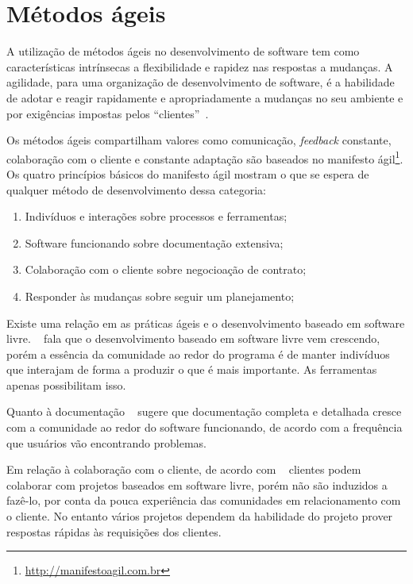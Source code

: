 
\section{Métodos ágeis}
\label{metodos-ageis}

A utilização de métodos ágeis no desenvolvimento de software tem como características 
intrínsecas a flexibilidade e rapidez nas respostas a mudanças. 
%
A agilidade, para uma organização de desenvolvimento de software, é a habilidade 
de adotar e reagir rapidamente e apropriadamente a mudanças no seu ambiente e por 
exigências impostas pelos ``clientes''~\cite{nerur2005}.
 	
Os métodos ágeis compartilham valores como comunicação, \emph{feedback} constante, colaboração com o cliente e constante adaptação são baseados no manifesto ágil\footnote{\url{http://manifestoagil.com.br}}. Os quatro princípios básicos do manifesto ágil mostram o que se espera de qualquer método de desenvolvimento dessa categoria:
%
\begin{enumerate}
\item Indivíduos  e interações sobre processos e ferramentas;
\item Software funcionando sobre documentação extensiva;
\item Colaboração com o cliente sobre negocioação de contrato;
\item Responder às  mudanças sobre seguir um planejamento;
\end{enumerate}

Existe uma relação em as práticas ágeis e o desenvolvimento baseado em software livre. ~ fala que o desenvolvimento baseado em software livre vem crescendo, porém a essência da comunidade ao redor do programa é de manter indivíduos que interajam de forma a produzir o que é mais importante. As ferramentas apenas possibilitam isso. 

Quanto à documentação ~ sugere que documentação completa e detalhada cresce com a comunidade ao redor do software funcionando, de acordo com a frequência que usuários vão encontrando problemas.

Em relação à colaboração com o cliente, de acordo com ~ clientes podem colaborar com projetos baseados em software livre, porém não são induzidos a fazê-lo, por conta da pouca experiência das comunidades em relacionamento com o cliente. No entanto vários projetos dependem da habilidade do projeto prover respostas rápidas às requisições dos clientes.


